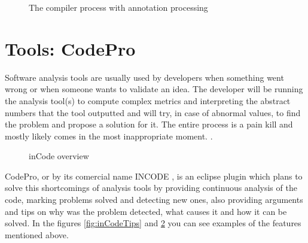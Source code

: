 \begin{figure}
\centering
{}
\caption{The compiler process with annotation
processing\cite{figure:javac-flow}\label{fig:annProc}}
\end{figure}
		

\section{Tools: CodePro}\label{ch:2.2}


	
	Software analysis tools are usually used by developers when something went
wrong or when someone wants to validate an idea. The developer will be running
the analysis tool(s) to compute complex metrics and interpreting the abstract numbers 
that the tool outputted and will try, in case of abnormal values, to find the
problem and propose a solution for it. The entire process is a pain kill and
mostly likely comes in the most inappropriate moment. \cite{tools:inCode}.

\begin{figure}[h]
\centering
{}
\caption{inCode overview \cite{tools:inCode} \label{fig:inCodeOverview}}
\end{figure}

	CodePro, or by its comercial name INCODE \cite{site:inCode}, is an eclipse
plugin which plans to solve this shortcomings of analysis tools by providing
continuous analysis of the code, marking problems solved and detecting new ones,
also providing arguments and tips on why was the problem detected, what causes
it and how it can be solved. In the figures \ref{fig:inCodeTips} and
\ref{fig:inCodeOverview} you can see examples of the features mentioned above.

